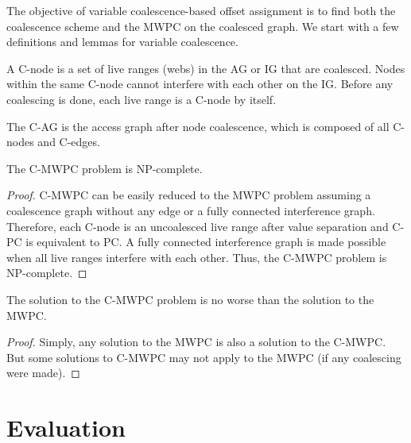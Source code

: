 \documentclass[prodmode,acmtecs]{acmsmall} %
\begin{document}
The objective of variable coalescence-based offset assignment is to find
both the coalescence scheme and the MWPC on the coalesced graph. We start
with a few definitions and lemmas for variable coalescence.

\begin{definition}A C-node is a set of
live ranges (webs) in the AG or IG that are coalesced. Nodes within the same
C-node cannot interfere with each other on the IG. Before any coalescing is
done, each live range is a C-node by itself.
\end{definition}

\begin{definition}The C-AG is the access
graph after node coalescence, which is composed of all C-nodes and C-edges.
\end{definition}

\begin{lemma}
The C-MWPC problem is NP-complete.
\end{lemma}
\begin{proof} C-MWPC can be easily reduced to the MWPC problem assuming a
coalescence graph without any edge or a fully connected interference graph.
Therefore, each C-node is an uncoalesced live range after value separation
and C-PC is equivalent to PC. A fully connected interference graph is made
possible when all live ranges interfere with each other. Thus, the C-MWPC
problem is NP-complete.
\end{proof}

\begin{lemma}The solution to the C-MWPC problem is no
worse than the solution to the MWPC.
\end{lemma}
\begin{proof}
Simply, any solution to the MWPC is also a solution to the
C-MWPC. But some solutions to C-MWPC may not apply to the MWPC (if any
coalescing were made).
\end{proof}

\section{Evaluation}
\end{document}
